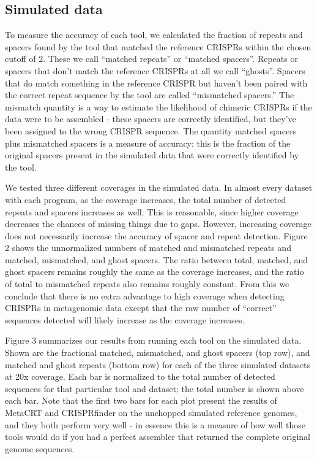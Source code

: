 \documentclass{bmcart}
\begin{document}
\subsection*{Simulated data}
To measure the accuracy of each tool, we calculated the fraction of repeats and spacers found by the tool that matched the reference CRISPRs within the chosen cutoff of 2. These we call “matched repeats” or “matched spacers”. Repeats or spacers that don’t match the reference CRISPRs at all we call “ghosts”. Spacers that do match something in the reference CRISPR but haven’t been paired with the correct repeat sequence by the tool are called “mismatched spacers.”  The mismatch quantity is a way to estimate the likelihood of chimeric CRISPRs if the data were to be assembled - these spacers are correctly identified, but they’ve been assigned to the wrong CRISPR sequence. The quantity matched spacers plus mismatched spacers is a measure of accuracy: this is the fraction of the original spacers present in the simulated data that were correctly identified by the tool.
 
We tested three different coverages in the simulated data. In almost every dataset with each program, as the coverage increases, the total number of detected repeats and spacers increases as well. This is reasonable, since higher coverage decreases the chances of missing things due to gaps. However, increasing coverage does not necessarily increase the accuracy of spacer and repeat detection. Figure 2 shows the unnormalized numbers of matched and mismatched repeats and matched, mismatched, and ghost spacers. The ratio between total, matched, and ghost spacers remains roughly the same as the coverage increases, and the ratio of total to mismatched repeats also remains roughly constant. From this we conclude that there is no extra advantage to high coverage when detecting CRISPRs in metagenomic data except that the raw number of “correct” sequences detected will likely increase as the coverage increases. 

Figure 3 summarizes our results from running each tool on the simulated data. Shown are the fractional matched, mismatched, and ghost spacers (top row), and matched and ghost repeats (bottom row) for each of the three simulated datasets at 20x coverage. Each bar is normalized to the total number of detected sequences for that particular tool and dataset; the total number is shown above each bar. Note that the first two bars for each plot present the results of MetaCRT and CRISPRfinder on the unchopped simulated reference genomes, and they both perform very well - in essence this is a measure of how well those tools would do if you had a perfect assembler that returned the complete original genome sequences. 
\end{document}
